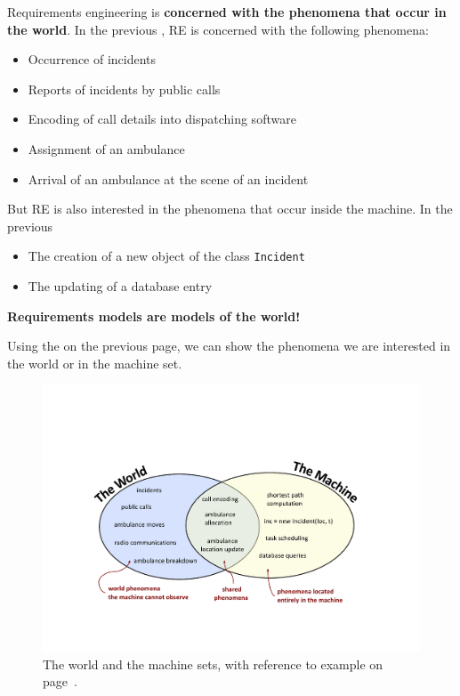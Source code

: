 \highspace
Requirements engineering is \textbf{concerned with the phenomena that occur in the world}. In the previous , RE is concerned with the following phenomena:
\begin{itemize}
    \item Occurrence of incidents
    \item Reports of incidents by public calls
    \item Encoding of call details into dispatching software
    \item Assignment of an ambulance
    \item Arrival of an ambulance at the scene of an incident
\end{itemize}
But RE is also interested in the phenomena that occur inside the machine. In the previous 
\begin{itemize}
    \item The creation of a new object of the class \texttt{Incident}
    \item The updating of a database entry
\end{itemize}
\textbf{Requirements models are models of the world!}

\newpage

\noindent
Using the  on the previous page, we can show the phenomena we are interested in the world or in the machine set.
\begin{figure}[!htp]
    \centering
    \includegraphics[width=\textwidth]{img/world-and-machine-1.pdf}
    \caption{The world and the machine sets, with reference to example on page~\pageref{example: ambulance dispatching system}.}
\end{figure}

